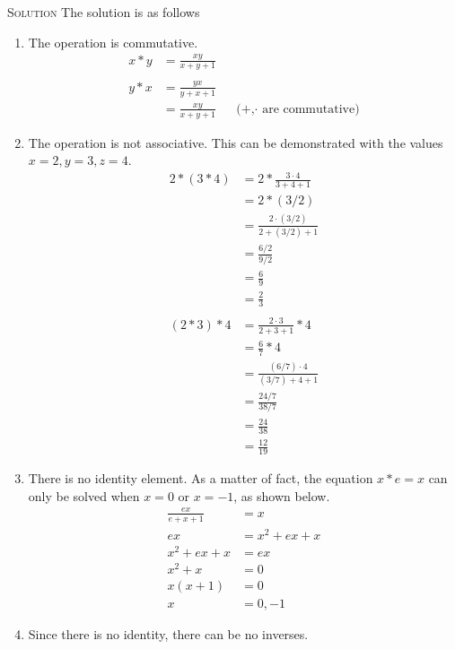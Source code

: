 \documentclass{amsart}
\newcommand{\Solution}{\textsc{Solution}\xspace}
\begin{document}
\begin{enumerate}
   \noindent \Solution The solution is as follows
   \begin{enumerate}
      \item The operation is commutative.
      \begin{align*}
         x * y & = \frac{xy}{x + y + 1} \\
	 \\
	 y * x & = \frac{yx}{y + x + 1} \\
	       & = \frac{xy}{x + y + 1} && \text{(+,$\cdot$ are commutative)}
      \end{align*}

      \item The operation is not associative. This can be demonstrated 
      with the values $x = 2, y = 3, z = 4$.
      \begin{align*}
         2 * (3 * 4) & = 2 * \frac{3 \cdot 4}{3 + 4 + 1}   \\
	             & = 2 * (3/2) \\
		     & = \frac{2 \cdot (3/2)}{2 + (3/2) + 1} \\
		     & = \frac{6/2}{9/2} \\
		     & = \frac{6}{9} \\
		     & = \frac{2}{3} \\
		     \\
	 (2 * 3) * 4 & = \frac{2 \cdot 3}{2 + 3 + 1} * 4 \\
	             & = \frac{6}{7} * 4 \\
		     & = \frac{(6/7) \cdot 4}{(3/7) + 4 + 1} \\
		     & = \frac{24/7}{38/7} \\
		     & = \frac{24}{38} \\
		     & = \frac{12}{19}
      \end{align*}

      \item There is no identity element. As a matter of fact,
      the equation $x * e = x$ can only be solved when $x = 0$ or $x = -1$, as 
      shown below.
      \begin{align*}
         \frac{ex}{e + x + 1} & = x \\
	 ex                   & = x^2 + ex + x \\
	 x^2 + ex + x         & = ex \\
	 x^2 + x              & = 0 \\
	 x(x+1)               & = 0 \\
	 x                    & = 0, -1
      \end{align*}

      \item Since there is no identity, there can be no inverses.
   \end{enumerate}

\end{enumerate}
\end{document}
